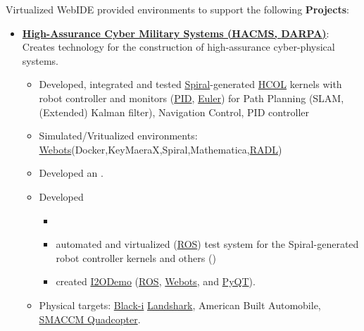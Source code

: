 \documentclass{article}
\newenvironment{achievements}{\begin{list}{$\bullet$}{\topsep 0pt \itemsep -2pt}}{\vspace*{4pt}\end{list}}
\begin{document}
  Virtualized WebIDE provided environments to support the following \textbf{Projects}:

        
\begin{itemize}

\item \textbf{\href{http://www.darpa.mil/Our_Work/I2O/Programs/High-Assurance_Cyber_Military_Systems_(HACMS).aspx}{High-Assurance Cyber Military Systems (HACMS, \href{http://www.darpa.mil/default.aspx}{DARPA})}}: Creates technology for the construction of high-assurance cyber-physical systems. 

  \begin{itemize}

    \item Developed, integrated and tested \href{http://spiral.net/}{Spiral}-generated \href{https://wiki.hh.se/wg211/images/e/e0/M13Franchetti.pdf}{HCOL} kernels with robot controller and monitors (\href{http://en.wikipedia.org/wiki/PID_controller}{PID}, 
\href{http://en.wikipedia.org/wiki/Euler_method}{Euler}) for Path Planning (SLAM, (Extended) Kalman filter), Navigation Control, PID controller 

    \item Simulated/Vritualized environments: \href{http://www.cyberbotics.com/}{Webots}(Docker,KeyMaeraX,Spiral,Mathematica,\href{https://www.acsac.org/2014/workshops/law/Shankar_LAW2014.pdf}{RADL})     \item Developed an .      \item Developed 
    \begin{itemize}
      \item 
      \item automated and virtualized (\href{http://www.ros.org/}{ROS}) test system for the Spiral-generated robot controller kernels and others ()
      \item created \href{http://www.darpa.mil/about-us/offices/i2o}{I2O}\href{http://fedscoop.com/darpa-showcases-projects-pentagon-courtyard}{Demo} (\href{http://www.ros.org/}{ROS}, \href{http://www.cyberbotics.com/}{Webots}, and \href{https://wiki.python.org/moin/PyQt}{PyQT}).
    \end{itemize}

    \item Physical targets: \href{http://blackirobotics.com/DARPA-SN-12-26_HACMS.php}{Black-i} \href{http://www.blackirobotics.com/LandShark_UGV_UC0M.html}{Landshark}, American Built Automobile, \href{http://smaccmpilot.org/}{SMACCM Quadcopter}. 


\end{itemize}
\end{itemize}
\end{document}
